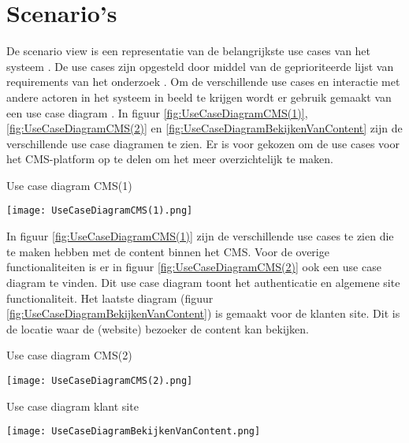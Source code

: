 \section{Scenario's}
De scenario view is een representatie van de belangrijkste use cases van het systeem \parencite{4+1ViewModelPaper}.
De use cases zijn opgesteld door middel van de geprioriteerde lijst van requirements van het onderzoek \parencite{DanteOnderzoek}.
Om de verschillende use cases en interactie met andere actoren in het systeem in beeld te krijgen wordt er gebruik gemaakt van een use case diagram \parencite{UseCaseDiagram}.
In figuur \ref{fig:UseCaseDiagramCMS(1)}, \ref{fig:UseCaseDiagramCMS(2)} en \ref{fig:UseCaseDiagramBekijkenVanContent} zijn de verschillende use case diagramen te zien.
Er is voor gekozen om de use cases voor het CMS-platform op te delen om het meer overzichtelijk te maken.

\whitespace[2]
\begin{graphic}
	\captionsetup{type=figure}
	\caption{Use case diagram CMS(1)}
	\texttt{[image: UseCaseDiagramCMS(1).png]}
	\label{fig:UseCaseDiagramCMS(1)}
\end{graphic}

\whitespace[2]
In figuur \ref{fig:UseCaseDiagramCMS(1)} zijn de verschillende use cases te zien die te maken hebben met de content binnen het CMS.
Voor de overige functionaliteiten is er in figuur \ref{fig:UseCaseDiagramCMS(2)} ook een use case diagram te vinden.
Dit use case diagram toont het authenticatie en algemene site functionaliteit.
Het laatste diagram (figuur \ref{fig:UseCaseDiagramBekijkenVanContent}) is gemaakt voor de klanten site.
Dit is de locatie waar de (website) bezoeker de content kan bekijken.

\newpage
\begin{graphic}
	\captionsetup{type=figure}
	\caption{Use case diagram CMS(2)}
	\texttt{[image: UseCaseDiagramCMS(2).png]}
	\label{fig:UseCaseDiagramCMS(2)}
\end{graphic}

\whitespace
\begin{graphic}
	\captionsetup{type=figure}
	\caption{Use case diagram klant site}
	\texttt{[image: UseCaseDiagramBekijkenVanContent.png]}
	\label{fig:UseCaseDiagramBekijkenVanContent}
\end{graphic}
